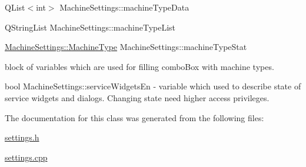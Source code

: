 \begin{DoxyCompactItemize}
\item\mbox{\label{classMachineSettings_abe0a0868f7081db78076e61fd8793384}} 
{\footnotesize\ttfamily Q\+List$<$int$>$ Machine\+Settings\+::\texorpdfstring{machine\+Type\+Data}{machineTypeData}} 

\item\mbox{\label{classMachineSettings_ad0e371856a610c685f0cde9f9cb2b5c5}} 
{\footnotesize\ttfamily Q\+String\+List Machine\+Settings\+::\texorpdfstring{machine\+Type\+List}{machineTypeList}}

\item\mbox{\label{classMachineSettings_ae3167629c7a8723b123ff5616fb284af}} 
{\footnotesize\ttfamily \mbox{\hyperlink{classMachineSettings_af95330ff3a80de06fe956f5297ec0fc5}{Machine\+Settings\+::\+Machine\+Type}} Machine\+Settings\+::\texorpdfstring{machine\+Type\+Stat}{machineTypeStat}{\ttfamily [static]}}

block of variables which are used for filling combo\+Box with machine types.
\end{DoxyCompactItemize}
\mbox{\label{classMachineSettings_a9a8e6bc0e09fa8ac8e32e30cbbd5ef4c}} 
{\footnotesize\ttfamily bool Machine\+Settings\+::\texorpdfstring{service\+Widgets\+En}{serviceWidgetsEn}{\ttfamily [static]}} - variable which used to describe state of service widgets and dialogs. Changing state need higher access privileges.



The documentation for this class was generated from the following files\+:\begin{DoxyCompactItemize}
\item 
\mbox{\hyperlink{settings_8h}{settings.\+h}}\item 
\mbox{\hyperlink{settings_8cpp}{settings.\+cpp}}\end{DoxyCompactItemize}
\newpage